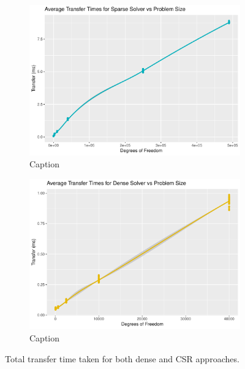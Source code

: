 \begin{figure}
	\centering
	\begin{subfigure}{0.48\linewidth}
		\centering
		\includegraphics[width = \linewidth]{Plots/transf_sparse_vs_n}
		\caption{Caption}
		\label{fig:transf_sparse}
	\end{subfigure}\hfill
	\begin{subfigure}{0.48\linewidth}
		\centering
		\includegraphics[width=\linewidth]{Plots/transf_dense_vs_n}
		\caption{Caption}
		\label{fig:transf_dense}
	\end{subfigure}
	\caption{Total transfer time taken for both dense and CSR approaches.}
	\label{fig:transf}
\end{figure}

